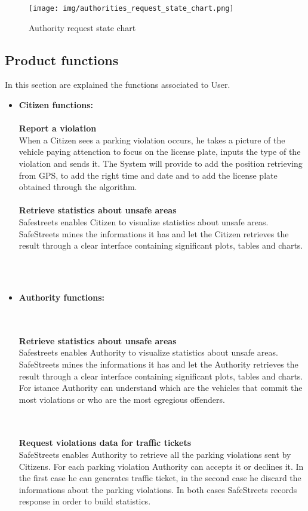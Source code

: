 \documentclass{article}
\begin{document}
\begin{figure}[h!]
    \centering
    \texttt{[image: img/authorities\_request\_state\_chart.png]}
    \caption{Authority request state chart}
\end{figure}

\subsection{Product functions}
In this section are explained the functions associated to User.
\begin{itemize}
 \item \textbf{Citizen functions:}
 \\\\\textbf{Report a violation}
 \\When a Citizen sees a parking violation occurs, he takes a picture of the vehicle paying attenction to focus on the 
 license plate, inputs the type of the violation and sends it. The System will provide to add the position retrieving 
 from GPS, to add the right time and date and to add the license plate obtained through the algorithm. 
\\\\\textbf{Retrieve statistics about unsafe areas}
\\Safestreets enables Citizen to visualize statistics about unsafe areas. SafeStreets mines the informations it has and let 
the Citizen retrieves the result through a clear interface containing significant plots, tables and charts. 

 \\\\\item \textbf{Authority functions:}
 
 \\\\\textbf{Retrieve statistics about unsafe areas}
 \\Safestreets enables Authority to visualize statistics about unsafe areas. SafeStreets mines the informations it has and let 
 the Authority retrieves the result through a clear interface containing significant plots, tables and charts. For istance 
 Authority can understand which are the vehicles that commit the most violations or who are the most egregious offenders.
  
 \\\\\textbf{Request violations data for traffic tickets}
\\SafeStreets enables Authority to retrieve all the parking violations sent by Citizens. For each parking violation Authority can
 accepts it or declines it. In the first case he can generates traffic ticket, in the second case he discard the informations about
 the parking violations. In both cases SafeStreets records response in order to build statistics.

\end{itemize}
\end{document}
